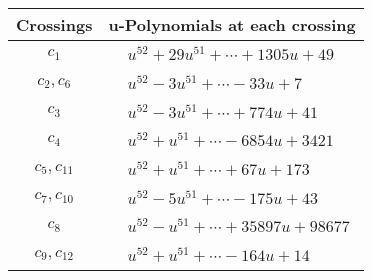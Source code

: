 \documentclass[1p]{elsarticle_modified}
\theoremstyle{definition}
\begin{document}
\begin{tabular}{m{50pt}|m{274pt}}
Crossings & \hspace{64pt}u-Polynomials at each crossing \\
\hline $$\begin{aligned}c_{1}\end{aligned}$$&$\begin{aligned}
&u^{52}+29 u^{51}+\cdots+1305 u+49
\end{aligned}$\\
\hline $$\begin{aligned}c_{2},c_{6}\end{aligned}$$&$\begin{aligned}
&u^{52}-3 u^{51}+\cdots-33 u+7
\end{aligned}$\\
\hline $$\begin{aligned}c_{3}\end{aligned}$$&$\begin{aligned}
&u^{52}-3 u^{51}+\cdots+774 u+41
\end{aligned}$\\
\hline $$\begin{aligned}c_{4}\end{aligned}$$&$\begin{aligned}
&u^{52}+u^{51}+\cdots-6854 u+3421
\end{aligned}$\\
\hline $$\begin{aligned}c_{5},c_{11}\end{aligned}$$&$\begin{aligned}
&u^{52}+u^{51}+\cdots+67 u+173
\end{aligned}$\\
\hline $$\begin{aligned}c_{7},c_{10}\end{aligned}$$&$\begin{aligned}
&u^{52}-5 u^{51}+\cdots-175 u+43
\end{aligned}$\\
\hline $$\begin{aligned}c_{8}\end{aligned}$$&$\begin{aligned}
&u^{52}- u^{51}+\cdots+35897 u+98677
\end{aligned}$\\
\hline $$\begin{aligned}c_{9},c_{12}\end{aligned}$$&$\begin{aligned}
&u^{52}+u^{51}+\cdots-164 u+14
\end{aligned}$\\
\hline
\end{tabular}\\~\\
\end{document}
